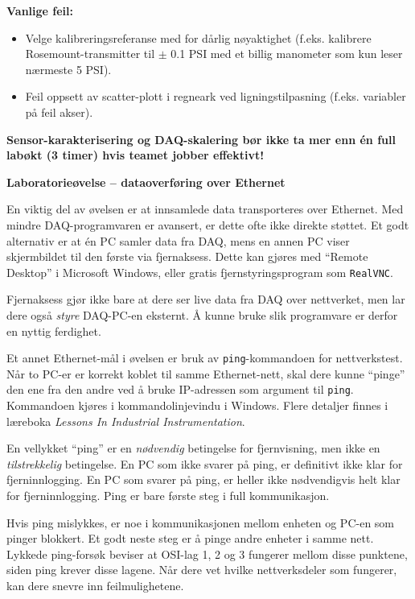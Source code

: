 {\bf Vanlige feil:}

\begin{itemize}
\item{} Velge kalibreringsreferanse med for dårlig nøyaktighet (f.eks. kalibrere Rosemount-transmitter til $\pm$ 0.1 PSI med et billig manometer som kun leser nærmeste 5 PSI).
\item{} Feil oppsett av scatter-plott i regneark ved ligningstilpasning (f.eks. variabler på feil akser).
\end{itemize}

\vskip 10pt

{\bf Sensor-karakterisering og DAQ-skalering bør ikke ta mer enn én full labøkt (3 timer) hvis teamet jobber effektivt!}




\vfil \eject

\noindent
{\bf Laboratorieøvelse -- dataoverføring over Ethernet}

\vskip 5pt

En viktig del av øvelsen er at innsamlede data transporteres over Ethernet. Med mindre DAQ-programvaren er avansert, er dette ofte ikke direkte støttet. Et godt alternativ er at én PC samler data fra DAQ, mens en annen PC viser skjermbildet til den første via fjernaksess. Dette kan gjøres med ``Remote Desktop'' i Microsoft Windows, eller gratis fjernstyringsprogram som {\tt RealVNC}.

Fjernaksess gjør ikke bare at dere ser live data fra DAQ over nettverket, men lar dere også {\it styre} DAQ-PC-en eksternt. Å kunne bruke slik programvare er derfor en nyttig ferdighet.

\vskip 10pt

Et annet Ethernet-mål i øvelsen er bruk av {\tt ping}-kommandoen for nettverkstest. Når to PC-er er korrekt koblet til samme Ethernet-nett, skal dere kunne ``pinge'' den ene fra den andre ved å bruke IP-adressen som argument til {\tt ping}. Kommandoen kjøres i kommandolinjevindu i Windows. Flere detaljer finnes i læreboka {\it Lessons In Industrial Instrumentation}.

En vellykket ``ping'' er en {\it nødvendig} betingelse for fjernvisning, men ikke en {\it tilstrekkelig} betingelse. En PC som ikke svarer på ping, er definitivt ikke klar for fjerninnlogging. En PC som svarer på ping, er heller ikke nødvendigvis helt klar for fjerninnlogging. Ping er bare første steg i full kommunikasjon.

\vskip 10pt

Hvis ping mislykkes, er noe i kommunikasjonen mellom enheten og PC-en som pinger blokkert. Et godt neste steg er å pinge andre enheter i samme nett. Lykkede ping-forsøk beviser at OSI-lag 1, 2 og 3 fungerer mellom disse punktene, siden ping krever disse lagene. Når dere vet hvilke nettverksdeler som fungerer, kan dere snevre inn feilmulighetene.

